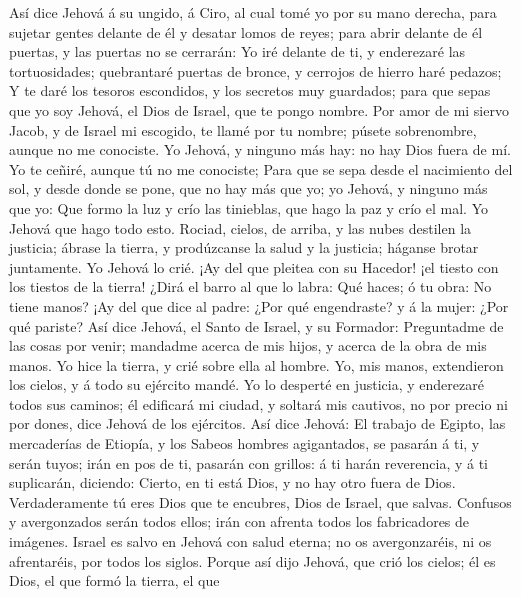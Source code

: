  Así dice Jehová á su ungido, á Ciro, al cual tomé yo por
su mano derecha, para sujetar gentes delante de él y desatar lomos de
reyes; para abrir delante de él puertas, y las puertas no se cerrarán:
 Yo iré delante de ti, y enderezaré las tortuosidades;
quebrantaré puertas de bronce, y cerrojos de hierro haré pedazos;
 Y te daré los tesoros escondidos, y los secretos muy
guardados; para que sepas que yo soy Jehová, el Dios de Israel, que te
pongo nombre.  Por amor de mi siervo Jacob, y de Israel mi
escogido, te llamé por tu nombre; púsete sobrenombre, aunque no me
conociste.  Yo Jehová, y ninguno más hay: no hay Dios
fuera de mí. Yo te ceñiré, aunque tú no me conociste; 
Para que se sepa desde el nacimiento del sol, y desde donde se pone, que
no hay más que yo; yo Jehová, y ninguno más que yo:  Que
formo la luz y crío las tinieblas, que hago la paz y crío el mal. Yo
Jehová que hago todo esto.  Rociad, cielos, de arriba, y
las nubes destilen la justicia; ábrase la tierra, y prodúzcanse la salud
y la justicia; háganse brotar juntamente. Yo Jehová lo crié.
 ¡Ay del que pleitea con su Hacedor! ¡el tiesto con los
tiestos de la tierra! ¿Dirá el barro al que lo labra: Qué haces; ó tu
obra: No tiene manos?  ¡Ay del que dice al padre: ¿Por
qué engendraste? y á la mujer: ¿Por qué pariste?  Así
dice Jehová, el Santo de Israel, y su Formador: Preguntadme de las cosas
por venir; mandadme acerca de mis hijos, y acerca de la obra de mis
manos.  Yo hice la tierra, y crié sobre ella al hombre.
Yo, mis manos, extendieron los cielos, y á todo su ejército mandé.
 Yo lo desperté en justicia, y enderezaré todos sus
caminos; él edificará mi ciudad, y soltará mis cautivos, no por precio
ni por dones, dice Jehová de los ejércitos.  Así dice
Jehová: El trabajo de Egipto, las mercaderías de Etiopía, y los Sabeos
hombres agigantados, se pasarán á ti, y serán tuyos; irán en pos de ti,
pasarán con grillos: á ti harán reverencia, y á ti suplicarán, diciendo:
Cierto, en ti está Dios, y no hay otro fuera de Dios. 
Verdaderamente tú eres Dios que te encubres, Dios de Israel, que salvas.
 Confusos y avergonzados serán todos ellos; irán con
afrenta todos los fabricadores de imágenes.  Israel es
salvo en Jehová con salud eterna; no os avergonzaréis, ni os
afrentaréis, por todos los siglos.  Porque así dijo
Jehová, que crió los cielos; él es Dios, el que formó la tierra, el que
